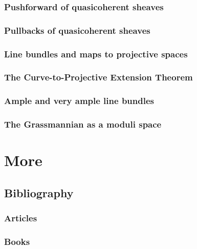 \documentclass[11pt]{book} %
\begin{document}
\section{Pushforward of quasicoherent sheaves}
\section{Pullbacks of quasicoherent sheaves}
\section{Line bundles and maps to projective spaces}
\section{The Curve-to-Projective Extension Theorem
}
\section{Ample and very ample line bundles}
\section{The Grassmannian as a moduli space}
\part{More}


\chapter*{Bibliography}


\section*{Articles}
\printbibliography[heading=bibempty,type=article]


\section*{Books}
\printbibliography[heading=bibempty,type=book]


\cleardoublepage
{}
\setlength{\columnsep}{0.75cm}
\printindex

\end{document}
